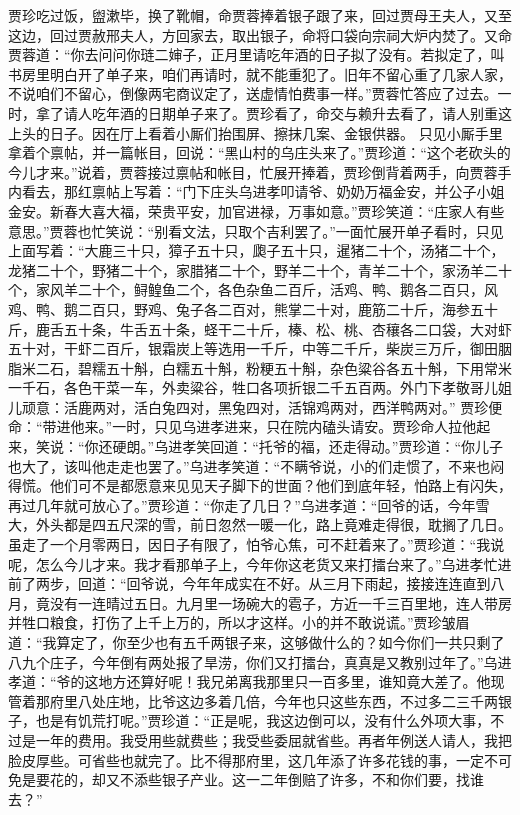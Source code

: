 \documentclass[12pt,oneside]{book}
\begin{document}
贾珍吃过饭，盥漱毕，换了靴帽，命贾蓉捧着银子跟了来，回过贾母王夫人，又至这边，回过贾赦邢夫人，方回家去，取出银子，命将口袋向宗祠大炉内焚了。又命贾蓉道：“你去问问你琏二婶子，正月里请吃年酒的日子拟了没有。若拟定了，叫书房里明白开了单子来，咱们再请时，就不能重犯了。旧年不留心重了几家人家，不说咱们不留心，倒像两宅商议定了，送虚情怕费事一样。”贾蓉忙答应了过去。一时，拿了请人吃年酒的日期单子来了。贾珍看了，命交与赖升去看了，请人别重这上头的日子。因在厅上看着小厮们抬围屏、擦抹几案、金银供器。
只见小厮手里拿着个禀帖，并一篇帐目，回说：“黑山村的乌庄头来了。”贾珍道：“这个老砍头的今儿才来。”说着，贾蓉接过禀帖和帐目，忙展开捧着，贾珍倒背着两手，向贾蓉手内看去，那红禀帖上写着：“门下庄头乌进孝叩请爷、奶奶万福金安，并公子小姐金安。新春大喜大福，荣贵平安，加官进禄，万事如意。”贾珍笑道：“庄家人有些意思。”贾蓉也忙笑说：“别看文法，只取个吉利罢了。”一面忙展开单子看时，只见上面写着：“大鹿三十只，獐子五十只，瓟子五十只，暹猪二十个，汤猪二十个，龙猪二十个，野猪二十个，家腊猪二十个，野羊二十个，青羊二十个，家汤羊二十个，家风羊二十个，鲟鳇鱼二个，各色杂鱼二百斤，活鸡、鸭、鹅各二百只，风鸡、鸭、鹅二百只，野鸡、兔子各二百对，熊掌二十对，鹿筋二十斤，海参五十斤，鹿舌五十条，牛舌五十条，蛏干二十斤，榛、松、桃、杏穰各二口袋，大对虾五十对，干虾二百斤，银霜炭上等选用一千斤，中等二千斤，柴炭三万斤，御田胭脂米二石，碧糯五十斛，白糯五十斛，粉粳五十斛，杂色粱谷各五十斛，下用常米一千石，各色干菜一车，外卖粱谷，牲口各项折银二千五百两。外门下孝敬哥儿姐儿顽意：活鹿两对，活白兔四对，黑兔四对，活锦鸡两对，西洋鸭两对。”
贾珍便命：“带进他来。”一时，只见乌进孝进来，只在院内磕头请安。贾珍命人拉他起来，笑说：“你还硬朗。”乌进孝笑回道：“托爷的福，还走得动。”贾珍道：“你儿子也大了，该叫他走走也罢了。”乌进孝笑道：“不瞒爷说，小的们走惯了，不来也闷得慌。他们可不是都愿意来见见天子脚下的世面？他们到底年轻，怕路上有闪失，再过几年就可放心了。”贾珍道：“你走了几日？”乌进孝道：“回爷的话，今年雪大，外头都是四五尺深的雪，前日忽然一暖一化，路上竟难走得很，耽搁了几日。虽走了一个月零两日，因日子有限了，怕爷心焦，可不赶着来了。”贾珍道：“我说呢，怎么今儿才来。我才看那单子上，今年你这老货又来打擂台来了。”乌进孝忙进前了两步，回道：“回爷说，今年年成实在不好。从三月下雨起，接接连连直到八月，竟没有一连晴过五日。九月里一场碗大的雹子，方近一千三百里地，连人带房并牲口粮食，打伤了上千上万的，所以才这样。小的并不敢说谎。”贾珍皱眉道：“我算定了，你至少也有五千两银子来，这够做什么的？如今你们一共只剩了八九个庄子，今年倒有两处报了旱涝，你们又打擂台，真真是又教别过年了。”乌进孝道：“爷的这地方还算好呢！我兄弟离我那里只一百多里，谁知竟大差了。他现管着那府里八处庄地，比爷这边多着几倍，今年也只这些东西，不过多二三千两银子，也是有饥荒打呢。”贾珍道：“正是呢，我这边倒可以，没有什么外项大事，不过是一年的费用。我受用些就费些；我受些委屈就省些。再者年例送人请人，我把脸皮厚些。可省些也就完了。比不得那府里，这几年添了许多花钱的事，一定不可免是要花的，却又不添些银子产业。这一二年倒赔了许多，不和你们要，找谁去？”
\end{document}
